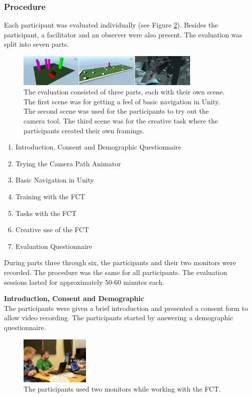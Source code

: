 \subsubsection{Procedure}
Each participant was evaluated individually (see Figure \ref{fig:tt}). Besides the participant, a facilitator and an observer were also present. The evaluation was split into seven parts. 
\begin{figure}[hbtp]
\centering
\includegraphics[width=0.8\textwidth]{Pics/sceneAll_horizontal}
\caption{The evaluation consisted of three parts, each with their own scene. The first scene was for getting a feel of basic navigation in Unity. The second scene was used for the participants to try out the camera tool. The third scene was for the creative task where the participants created their own framings.}
\label{fig:sceneAll}
\end{figure}

\begin{enumerate}
\item Introduction, Consent and Demographic Questionnaire
\item Trying the Camera Path Animator
\item Basic Navigation in Unity
\item Training with the FCT
\item Tasks with the FCT
\item Creative use of the FCT
\item Evaluation Questionnaire
\end{enumerate}

During parts three through six, the participants and their two monitors were recorded. The procedure was the same for all participants. The evaluation sessions lasted for approximately 50-60 minutes each. 

\textbf{Introduction, Consent and Demographic}\\
The participants were given a brief introduction and presented a consent form to allow video recording. The participants started by answering a demographic questionnaire. 

\begin{figure}[htbp]
\centering
\includegraphics[width=0.3\textwidth]{Pics/test_setup}
\caption{The participants used two monitors while working with the FCT.}
\label{fig:tt}
\end{figure}

